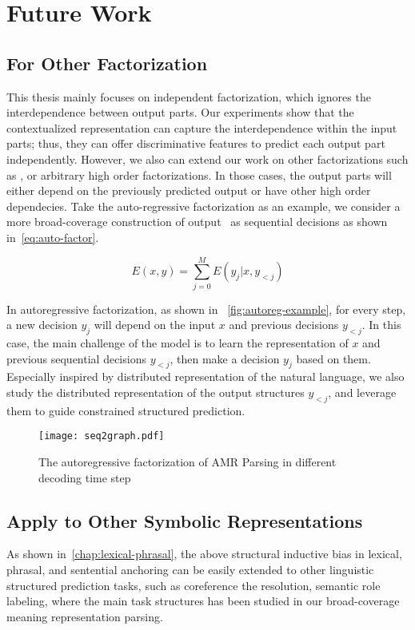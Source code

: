 \section{Future Work}
\label{sec:conclusions:future}

\subsection{For Other Factorization}
\label{ssec:future:other-factorization}

This thesis mainly focuses on independent factorization, which ignores
the interdependence between output parts. Our experiments show that
the contextualized representation can capture the interdependence
within the input parts; thus, they can offer discriminative features
to predict each output part independently. However, we also can extend
our work on other factorizations such as , or arbitrary high order factorizations. In those
cases, the output parts will either depend on the previously predicted
output or have other high order dependecies. Take the auto-regressive
factorization as an example, we consider a more broad-coverage
construction of output \OUT~as sequential decisions as shown
in~\autoref{eq:auto-factor}.

\begin{equation}
  \label{eq:auto-factor}
E(x, y)=\sum_{j=0}^{M}E(y_{j}|x,y_{<j})
\end{equation}

In autoregressive factorization, as shown in
~\autoref{fig:autoreg-example}, for every step, a new decision $y_{j}$
will depend on the input $x$ and previous decisions $y_{<j}$. In this
case, the main challenge of the model is to learn the representation
of $x$ and previous sequential decisions $y_{<j}$, then make a
decision $y_{j}$ based on them.  Especially inspired by distributed
representation of the natural language, we also study the distributed
representation of the output structures $y_{<j}$, and leverage them to
guide constrained structured prediction.

\begin{figure}[h]
\centering
\texttt{[image: seq2graph.pdf]}
\caption{\label{fig:autoreg-example}The autoregressive factorization
  of AMR Parsing in different decoding time step}
\end{figure}

\subsection{Apply to Other Symbolic Representations}
\label{ssec:future:application}
As shown in~\autoref{chap:lexical-phrasal}, the above structural
inductive bias in lexical, phrasal, and sentential anchoring can be
easily extended to other linguistic structured prediction tasks, such
as coreference the resolution, semantic role labeling, where the main
task structures has been studied in our broad-coverage meaning
representation parsing.

